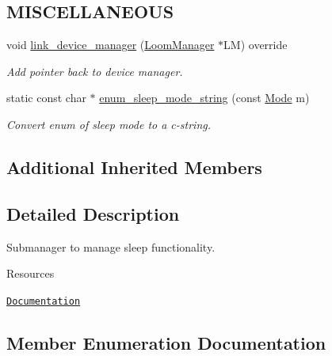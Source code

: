 \subsection*{M\+I\+S\+C\+E\+L\+L\+A\+N\+E\+O\+US}
\begin{DoxyCompactItemize}
\item 
void \hyperlink{class_loom___sleep___manager_a8b9622388b96fcb7a63b011a5b4e885e}{link\+\_\+device\+\_\+manager} (\hyperlink{class_loom_manager}{Loom\+Manager} $\ast$LM) override
\begin{DoxyCompactList}\small\item\em Add pointer back to device manager. \end{DoxyCompactList}\item 
static const char $\ast$ \hyperlink{class_loom___sleep___manager_aab509d2270fb079db04654e9e7aa2b7f}{enum\+\_\+sleep\+\_\+mode\+\_\+string} (const \hyperlink{class_loom___sleep___manager_ab1cb2baaf00c386048490c3787a2de13}{Mode} m)
\begin{DoxyCompactList}\small\item\em Convert enum of sleep mode to a c-\/string. \end{DoxyCompactList}\end{DoxyCompactItemize}
\subsection*{Additional Inherited Members}


\subsection{Detailed Description}
Submanager to manage sleep functionality. 

\begin{DoxyParagraph}{Resources}

\begin{DoxyItemize}
\item \href{https://openslab-osu.github.io/Loom/html/class_loom___sleep___manager.html}{\tt Documentation} 
\end{DoxyItemize}
\end{DoxyParagraph}


\subsection{Member Enumeration Documentation}

